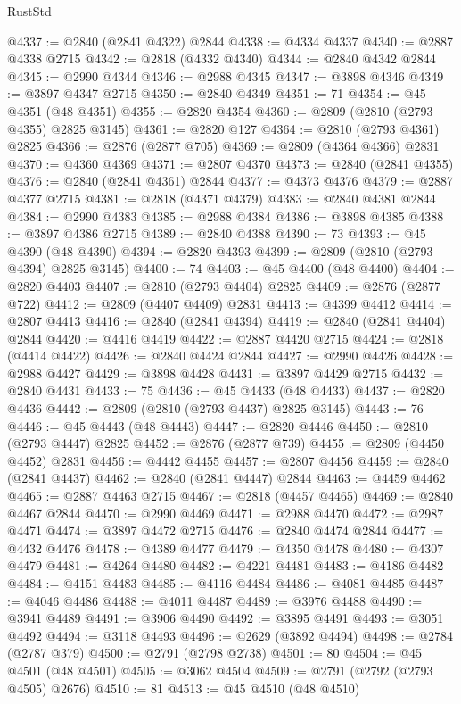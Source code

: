 \begin{lexlean}{RustStd}
\begin{coremodule}
{\begin{coremodule}
{{{{{{{{{{{{{{{{{{{{{{{{{{{{{{{{{@4337 := @2840 (@2841 @4322) @2844
@4338 := @4334 @4337
@4340 := @2887 @4338 @2715
@4342 := @2818 (@4332 @4340)
@4344 := @2840 @4342 @2844
@4345 := @2990 @4344
@4346 := @2988 @4345
@4347 := @3898 @4346
@4349 := @3897 @4347 @2715
@4350 := @2840 @4349
@4351 := 71
@4354 := @45 @4351 (@48 @4351)
@4355 := @2820 @4354
@4360 := @2809 (@2810 (@2793 @4355) @2825 @3145)
@4361 := @2820 @127
@4364 := @2810 (@2793 @4361) @2825
@4366 := @2876 (@2877 @705)
@4369 := @2809 (@4364 @4366) @2831
@4370 := @4360 @4369
@4371 := @2807 @4370
@4373 := @2840 (@2841 @4355)
@4376 := @2840 (@2841 @4361) @2844
@4377 := @4373 @4376
@4379 := @2887 @4377 @2715
@4381 := @2818 (@4371 @4379)
@4383 := @2840 @4381 @2844
@4384 := @2990 @4383
@4385 := @2988 @4384
@4386 := @3898 @4385
@4388 := @3897 @4386 @2715
@4389 := @2840 @4388
@4390 := 73
@4393 := @45 @4390 (@48 @4390)
@4394 := @2820 @4393
@4399 := @2809 (@2810 (@2793 @4394) @2825 @3145)
@4400 := 74
@4403 := @45 @4400 (@48 @4400)
@4404 := @2820 @4403
@4407 := @2810 (@2793 @4404) @2825
@4409 := @2876 (@2877 @722)
@4412 := @2809 (@4407 @4409) @2831
@4413 := @4399 @4412
@4414 := @2807 @4413
@4416 := @2840 (@2841 @4394)
@4419 := @2840 (@2841 @4404) @2844
@4420 := @4416 @4419
@4422 := @2887 @4420 @2715
@4424 := @2818 (@4414 @4422)
@4426 := @2840 @4424 @2844
@4427 := @2990 @4426
@4428 := @2988 @4427
@4429 := @3898 @4428
@4431 := @3897 @4429 @2715
@4432 := @2840 @4431
@4433 := 75
@4436 := @45 @4433 (@48 @4433)
@4437 := @2820 @4436
@4442 := @2809 (@2810 (@2793 @4437) @2825 @3145)
@4443 := 76
@4446 := @45 @4443 (@48 @4443)
@4447 := @2820 @4446
@4450 := @2810 (@2793 @4447) @2825
@4452 := @2876 (@2877 @739)
@4455 := @2809 (@4450 @4452) @2831
@4456 := @4442 @4455
@4457 := @2807 @4456
@4459 := @2840 (@2841 @4437)
@4462 := @2840 (@2841 @4447) @2844
@4463 := @4459 @4462
@4465 := @2887 @4463 @2715
@4467 := @2818 (@4457 @4465)
@4469 := @2840 @4467 @2844
@4470 := @2990 @4469
@4471 := @2988 @4470
@4472 := @2987 @4471
@4474 := @3897 @4472 @2715
@4476 := @2840 @4474 @2844
@4477 := @4432 @4476
@4478 := @4389 @4477
@4479 := @4350 @4478
@4480 := @4307 @4479
@4481 := @4264 @4480
@4482 := @4221 @4481
@4483 := @4186 @4482
@4484 := @4151 @4483
@4485 := @4116 @4484
@4486 := @4081 @4485
@4487 := @4046 @4486
@4488 := @4011 @4487
@4489 := @3976 @4488
@4490 := @3941 @4489
@4491 := @3906 @4490
@4492 := @3895 @4491
@4493 := @3051 @4492
@4494 := @3118 @4493
@4496 := @2629 (@3892 @4494)
@4498 := @2784 (@2787 @379)
@4500 := @2791 (@2798 @2738)
@4501 := 80
@4504 := @45 @4501 (@48 @4501)
@4505 := @3062 @4504
@4509 := @2791 (@2792 (@2793 @4505) @2676)
@4510 := 81
@4513 := @45 @4510 (@48 @4510)
}}}}}}}}}}}}}}}}}}}}}}}}}}}}}}}}}
\end{coremodule}}
\end{coremodule}
\end{lexlean}
